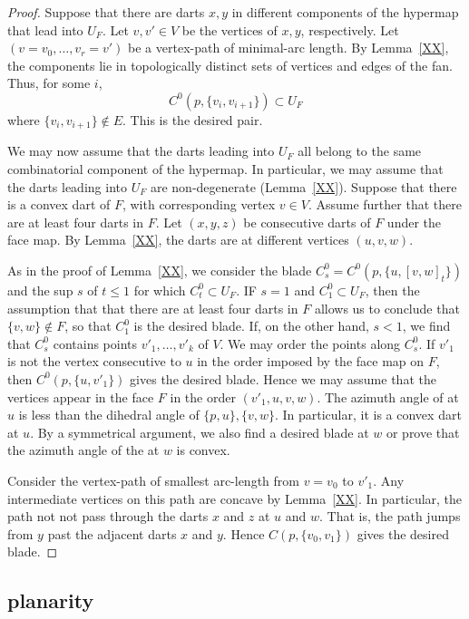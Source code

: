 \begin{proof} Suppose that there are darts $x,y$ in different components
of the hypermap that lead into $U_F$.  Let $v,v'\in V$ be the vertices of $x,y$, respectively.
Let $(v=v_0,\ldots,v_r=v')$ be a vertex-path of minimal-arc length.
By Lemma~\ref{XX},  the components
lie in topologically distinct sets of vertices and edges of the fan.   
Thus, for some $i$,
   $$
   C^0(p,\{v_i,v_{i+1}\})\subset U_F
   $$
where $\{v_i,v_{i+1}\}\not\in E$.  This is the desired pair.

We may now assume that the darts leading into $U_F$ all belong to the same
combinatorial component of the hypermap.  In particular, we may assume that
the darts leading into $U_F$ are non-degenerate (Lemma~\ref{XX}).
Suppose that there is a convex  dart of $F$, with corresponding vertex $v\in V$.
Assume further that there are at least four darts in $F$.
Let $(x,y,z)$ be consecutive darts of $F$ under the face map.  By Lemma~\ref{XX},
the darts are at different vertices $(u,v,w)$.  


As in the proof of 
Lemma~\ref{XX}, we consider the blade $C^0_s= C^0(p,\{u,[v,w]_t\})$ and the
sup $s$ of $t\le 1$ for which $C^0_t\subset U_F$.  IF $s=1$ and $C^0_1\subset U_F$,
then the assumption that that there are at least four darts in $F$ allows us
to conclude that $\{v,w\}\not\in F$, so that $C^0_1$ is the desired blade.
If, on the other hand, $s<1$, we find that $C^0_s$ contains points
$v'_1,\ldots,v'_k$ of $V$.  We may order the points along $C^0_s$.  If
$v'_1$ is not the vertex consecutive to $u$ in the order imposed by the face map on $F$,
then $C^0(p,\{u,v'_1\})$ gives the desired blade.  Hence we may assume that
the vertices appear in the face $F$ in the order $(v'_1,u,v,w)$.  The azimuth
angle of at $u$ is less than the dihedral angle of $\{p,u\},\{v,w\}$.  In particular,
it is a convex dart at $u$.  By a symmetrical argument, we also find a desired blade at $w$
or prove that the azimuth angle of the at $w$ is convex.  

Consider the vertex-path of smallest arc-length from $v=v_0$ to $v'_1$.  Any intermediate
vertices on this path are concave by Lemma~\ref{XX}.  In particular, the path
not not pass through the darts $x$ and $z$ at $u$ and $w$.  That is, the path
jumps from $y$ past the adjacent darts $x$ and $y$.  Hence 
$C(p,\{v_0,v_1\})$ gives the desired blade.
\end{proof}



\subsection{planarity}



